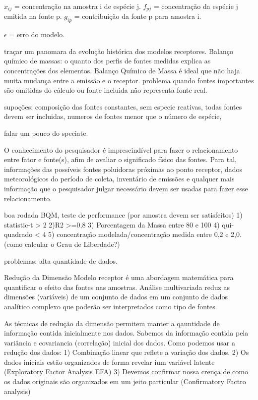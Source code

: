$x_{ij}$ = concentração na amostra i de espécie j.
$f_{pj}$ = concentração da espécie j emitida na fonte p. 
$g_{ip}$ = contribuição da fonte p para amostra i. 

$\epsilon$ = erro do modelo.

traçar um panomara da evolução histórica dos modelos receptores.
Balanço químico de massas: o quanto dos perfis de fontes medidas explica as concentrações dos elementos.
Balanço Químico de Massa
é ideal que não haja muita mudança entre a emissão e o receptor. problema quando fontes importantes são omitidas do cálculo ou fonte incluida não representa fonte real.

supoções: composição das fontes constantes, sem especie reativas, todas fontes devem ser incluidas, numeros de fontes menor que o número de espécie, 

falar um pouco do speciate. 

O conhecimento do pesquisador é imprescindível para fazer o relacionamento entre fator e fonte(s), afim de avaliar o significado físico das fontes. Para tal, informações das possíveis fontes poluidoras próximas ao ponto receptor, dados meteorológicos do período de coleta, inventário de emissões e qualquer mais informação que o pesquisador julgar necessário devem ser usadas para fazer esse relacionamento.

boa rodada BQM, teste de performance (por amostra devem ser satisfeitos)
1) statistic-t > 2
2)R2 >=0,8
3) Porcentagem da Massa entre 80 e 100 
4) qui-quadrado < 4
5) concentração modelada/concentração medida entre 0,2 e 2,0.  (como calcular o Grau de Liberdade?)

problemas: alta quantidade de dados.

Redução da Dimensão
Modelo receptor é uma abordagem matemática para quantificar o efeito das fontes nas amostras. 
Análise multivariada reduz as dimensões (variáveis) de um conjunto de dados em um conjunto de dados analítico complexo que poderão ser interpretados como tipo de fontes.


As técnicas de redução da dimensão permitem manter a qauntidade de informação contida inicialmente nos dados. Sabemos da informação contida pela variância e covariancia (correlação) inicial dos dados. Como podemos usar a redução dos dados: 
1) Combinação linear que reflete a variação dos dados. 
2) Os dados iniciais estão organizados de forma revelar ium variável latente (Exploratory Factor Analysis EFA)
3) Devemos confirmar nossa crença de como os dados originais são organizados em um jeito particular (Confirmatory Factro analysis)

